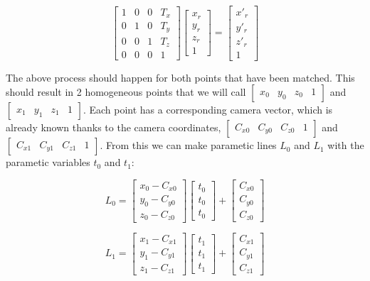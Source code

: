 \[
\begin{bmatrix}
  1 & 0 & 0 & T_x\\
  0 & 1 & 0 & T_y\\
  0 & 0 & 1 & T_z\\
  0 & 0 & 0 & 1
\end{bmatrix}
\begin{bmatrix}
  x_r\\
  y_r\\
  z_r\\
  1
\end{bmatrix}
=
\begin{bmatrix}
  x'_r\\
  y'_r\\
  z'_r\\
  1
\end{bmatrix}
\]

The above process should happen for both points that have been matched.
This should result in 2 homogeneous points that we will call $\begin{bmatrix}x_0 & y_0 & z_0 & 1 \end{bmatrix}$
and $\begin{bmatrix}x_1 & y_1 & z_1 & 1 \end{bmatrix}$. Each point has a corresponding camera vector,
which is already known thanks to the camera coordinates, $\begin{bmatrix}C_{x0} & C_{y0} & C_{z0} & 1 \end{bmatrix}$
and $\begin{bmatrix}C_{x1} & C_{y1} & C_{z1} & 1 \end{bmatrix}$. From this we can make parametic lines $L_0$ and $L_1$
with the parametic variables $t_0$ and $t_1$:

\[
L_0 =
\begin{bmatrix}
  x_0 - C_{x0}\\
  y_0 - C_{y0}\\
  z_0 - C_{z0}
\end{bmatrix}
\begin{bmatrix}
  t_0\\
  t_0\\
  t_0
\end{bmatrix}
+
\begin{bmatrix}
  C_{x0}\\
  C_{y0}\\
  C_{z0}
\end{bmatrix}
\]

\[
L_1 =
\begin{bmatrix}
  x_1 - C_{x1}\\
  y_1 - C_{y1}\\
  z_1 - C_{z1}
\end{bmatrix}
\begin{bmatrix}
  t_1\\
  t_1\\
  t_1
\end{bmatrix}
+
\begin{bmatrix}
  C_{x1}\\
  C_{y1}\\
  C_{z1}
\end{bmatrix}
\]

